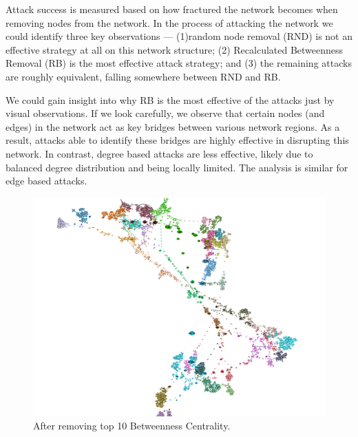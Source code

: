\documentclass[10pt,twocolumn,letterpaper]{article}
\begin{document}
Attack success is measured based on how fractured the network becomes when removing nodes from the network. In the process of attacking the network we could identify three key observations — (1)random node removal (RND) is not an effective strategy at all on this network structure; (2) Recalculated Betweenness Removal (RB) is the most effective attack strategy; and (3) the remaining attacks are roughly equivalent, falling somewhere between RND and RB.

We could gain insight into why RB is the most effective of the attacks just by visual observations. If we look carefully, we observe that certain nodes (and edges) in the network act as key bridges between various network regions. As a result, attacks able to identify these bridges are highly effective in disrupting this network. In contrast, degree based attacks are less effective, likely due to balanced degree distribution and being locally limited. The analysis is similar for edge based attacks.

\begin{figure}[t]
    \centering
    \includegraphics[width=0.8\linewidth]{images/PowerGrid_MC-BC2.png}
    \caption{After removing top 10 Betweenness Centrality.}
    \label{fig:onecol}
\end{figure}
\end{document}
